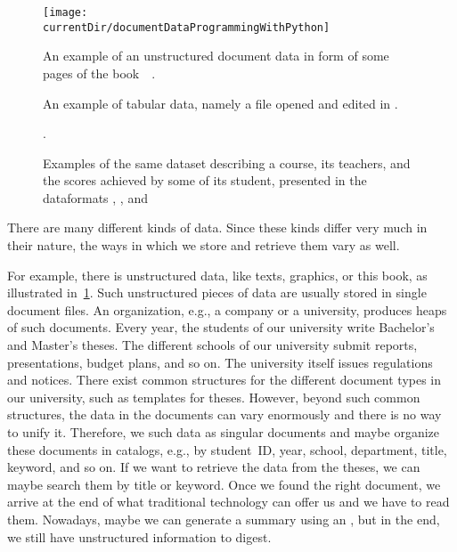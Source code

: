 %
\begin{figure}%
\centering%
\texttt{[image: \\currentDir/documentDataProgrammingWithPython]}%
\caption{An example of an unstructured document data in form of some pages of the book~~\cite{programmingWithPython}.}%
\label{fig:documentDataProgrammingWithPython}%
\end{figure}%
%
\begin{figure}%
\centering%
%
\caption{An example of tabular data, namely a  file opened and edited in \libreofficeCalc.}%
\label{fig:libreOfficeCalc}%
\end{figure}%
%
\begin{figure}%
\centering%
%
%
%
\floatSep%
%
%
%
\floatSep%
%
%
%
\caption{Examples of the same dataset describing a course, its teachers, and the scores achieved by some of its student, presented in the dataformats , , and }.%
\label{fig:treeDataStructures}%
\end{figure}%
%
There are many different kinds of data.%
Since these kinds differ very much in their nature, the ways in which we store and retrieve them vary as well.

For example, there is unstructured data, like texts, graphics, or this book, as illustrated in~\cref{fig:documentDataProgrammingWithPython}.
Such unstructured pieces of data are usually stored in single document files.
An organization, e.g., a company or a university, produces heaps of such documents.
Every year, the students of our university write Bachelor's and Master's theses.
The different schools of our university submit reports, presentations, budget plans, and so on.
The university itself issues regulations and notices.
There exist common structures for the different document types in our university, such as templates for theses.
However, beyond such common structures, the data in the documents can vary enormously and there is no way to unify it.
Therefore, we  such data as singular documents and maybe organize these documents in catalogs, e.g., by student~ID, year, school, department, title, keyword, and so on.
If we want to retrieve the data from the theses, we can maybe search them by title or keyword.
Once we found the right document, we arrive at the end of what traditional technology can offer us and we have to read them.
Nowadays, maybe we can generate a summary using an , but in the end, we still have unstructured information to digest.


